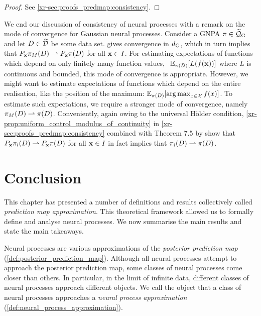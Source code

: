 \documentclass[12pt, twoside]{report}
\newcommand{\xrprefix}[1]{xr-#1}
\begin{document}
\begin{proof}
    See \cref{\xrprefix{sec:proofs_predmap:consistency}}.
\end{proof}

We end our discussion of consistency of neural processes with a remark on the mode of convergence for Gaussian neural processes.
Consider a GNPA $\pi \in \widetilde \Qc\ss{G}$ and
let $D \in \widetilde{\mathcal{D}}$ be some data set.
 gives convergence in $d\ss{G}$, which in turn implies that $P_{\mathbf{x}} \pi_M(D) \rightharpoonup P_{\mathbf{x}} \pi(D)$ for all $\mathbf{x} \in I$.
For estimating expectations of functions which depend on only finitely many function values, \eg~$\mathbb{E}_{\pi(D)}[L(f(\mathbf{x}))]$ where $L$ is continuous and bounded, this mode of convergence is appropriate.
However, we might want to estimate expectations of functions which depend on the entire realisation, like the position of the maximum: $\mathbb{E}_{\pi(D)}[\operatorname*{arg\,max}_{x \in \mathcal{X}} f(x)]$.
To estimate such expectations, we require a stronger mode of convergence, namely $\pi_M(D) \rightharpoonup \pi(D)$.
Conveniently, again owing to the universal H\"older condition, \cref{\xrprefix{prop:uniform_control_modulus_of_continuity}} in \cref{\xrprefix{sec:proofs_predmap:consistency}} combined with Theorem 7.5 by \textcite{Billingsley:1999:Convergence_of_Probability_Measures} show that
 $P_{\mathbf{x}} \pi_i(D) \rightharpoonup P_{\mathbf{x}} \pi(D)$ for all $\mathbf{x} \in I$ in fact implies that $\pi_i(D) \rightharpoonup \pi(D)$.

\section{Conclusion}

This chapter has presented a number of definitions and results collectively called \emph{prediction map approximation}.
This theoretical framework allowed us to formally define and analyse neural processes. 
We now summarise the main results and state the main takeaways.

Neural processes are various approximations of the \emph{posterior prediction map} (\cref{def:posterior_prediction_map}).
Although all neural processes attempt to approach the posterior prediction map, some classes of neural processes come closer than others.
In particular, in the limit of infinite data, different classes of neural processes approach different objects.
We call the object that a class of neural processes approaches a \emph{neural process approximation} (\cref{def:neural_process_approximation}).
\end{document}
